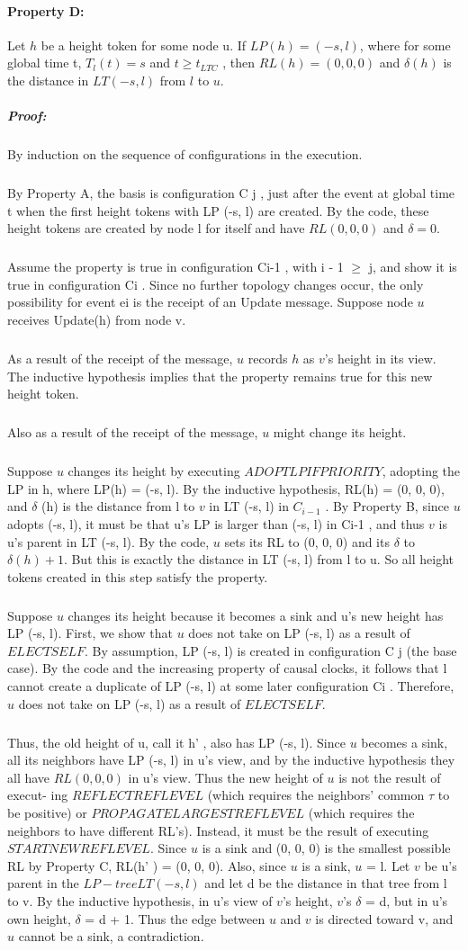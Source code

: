 \paragraph{Property D:}Let $h$ be a height token for some node u. If $LP(h) = (-s, l)$, where for some global time t, $T_l (t) = s$ and $t \geq t_{LTC}$ , then $RL(h) = (0, 0, 0)$ and $\delta (h)$ is the distance in $LT (-s, l)$ from $l$ to $u$.
\subparagraph{Proof:}By induction on the sequence of configurations in the execution.
\subparagraph{}By Property A, the basis is configuration C j , just after the event at global time t when the first height tokens with LP (-s, l) are created. By the code, these height tokens are created by node l for itself and have $RL (0, 0, 0)$ and $\delta = 0$.
\subparagraph{}Assume the property is true in configuration Ci-1 , with i - 1 $\geq$ j, and show it is true in configuration Ci . Since no further topology changes occur, the only possibility for event ei is the receipt of an Update message. Suppose node $u$ receives Update(h) from node v.
\subparagraph{}As a result of the receipt of the message, $u$ records $h$ as $v$'s height in its view. The inductive hypothesis implies that the property remains true for this new height token.
\subparagraph{}Also as a result of the receipt of the message, $u$ might change its height.
\subparagraph{}Suppose $u$ changes its height by executing $ADOPTLPIFPRIORITY$, adopting the LP in h, where LP(h) = (-s, l). By the inductive hypothesis, RL(h) = (0, 0, 0), and $\delta$ (h) is the distance from l to $v$ in LT (-s, l) in $C_{i-1}$ . By Property B, since $u$ adopts (-s, l), it must be that u's LP is larger than (-s, l) in Ci-1 , and thus $v$ is u's parent in LT (-s, l). By the code, $u$ sets its RL to (0, 0, 0) and its $\delta$ to $\delta (h) + 1$. But this is exactly the distance in LT (-s, l) from l to u. So all height tokens created in this step satisfy the property.
\subparagraph{}Suppose $u$ changes its height because it becomes a sink and u's new height has LP (-s, l). First, we show that $u$ does not take on LP (-s, l) as a result of $ELECTSELF$. By assumption, LP (-s, l) is created in configuration C j (the base case). By the code and the increasing property of causal clocks, it follows that l cannot create a duplicate of LP (-s, l) at some later configuration Ci . Therefore, $u$ does not take on LP (-s, l) as a result of $ELECTSELF$.
\subparagraph{}Thus, the old height of u, call it h' , also has LP (-s, l). Since $u$ becomes a sink, all its neighbors have LP (-s, l) in u's view, and by the inductive hypothesis they all have $RL (0, 0, 0)$ in u's view. Thus the new height of $u$ is not the result of execut- ing $REFLECTREFLEVEL$ (which requires the neighbors' common $\tau$ to be positive) or $PROPAGATELARGESTREFLEVEL$ (which requires the neighbors to have different RL's). Instead, it must be the result of executing $STARTNEWREFLEVEL$. Since $u$ is a sink and (0, 0, 0) is the smallest possible RL by Property C, RL(h' ) = (0, 0, 0). Also, since $u$ is a sink, $u$ = l. Let $v$ be u's parent in the $LP-tree LT (-s, l)$ and let d be the distance in that tree from l to v. By the inductive hypothesis, in u's view of $v$'s height, $v$'s $\delta$ = d, but in u's own height, $\delta$ = d + 1. Thus the edge between $u$ and $v$ is directed toward v, and $u$ cannot be a sink, a contradiction.
